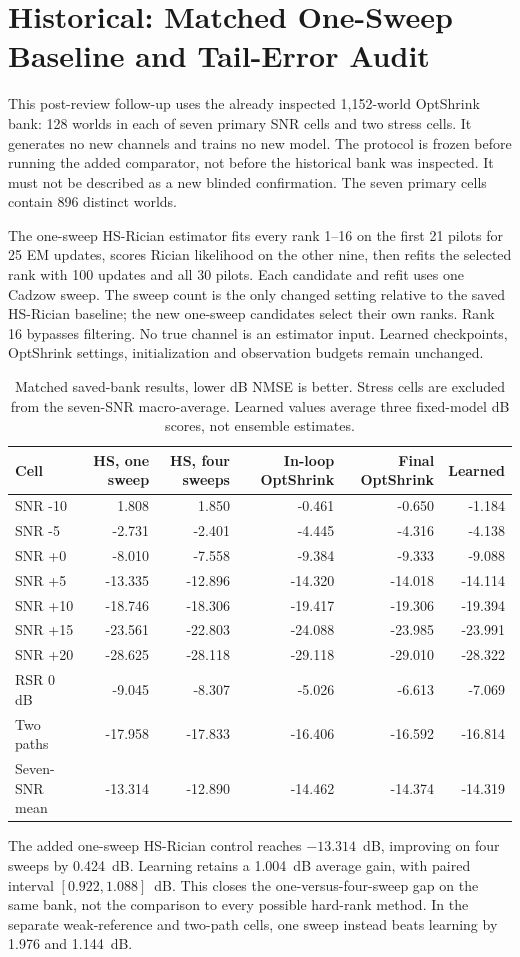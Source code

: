 \section{Historical: Matched One-Sweep Baseline and Tail-Error Audit}
This post-review follow-up uses the already inspected 1,152-world
OptShrink bank: 128 worlds in each of seven primary SNR cells and two
stress cells. It generates no new channels and trains no new model.
The protocol is frozen before running the added comparator, not before
the historical bank was inspected. It must not be described as a new
blinded confirmation. The seven primary cells contain 896 distinct worlds.

The one-sweep HS-Rician estimator fits every rank 1--16 on the first
21 pilots for 25 EM updates, scores Rician likelihood on the other nine,
then refits the selected rank with 100 updates and all 30 pilots.
Each candidate and refit uses one Cadzow sweep. The sweep count is the
only changed setting relative to the saved HS-Rician baseline; the new
one-sweep candidates select their own ranks. Rank 16 bypasses filtering.
No true channel is an estimator input. Learned checkpoints, OptShrink
settings, initialization and observation budgets remain unchanged.

\begin{table}[!t]
\caption{Matched saved-bank results, lower dB NMSE is better. Stress cells
are excluded from the seven-SNR macro-average. Learned values average
three fixed-model dB scores, not ensemble estimates.}
\centering\small\setlength{\tabcolsep}{5pt}
\begin{tabular}{@{}lrrrrr@{}}\toprule
Cell & HS, one sweep & HS, four sweeps & In-loop OptShrink & Final OptShrink & Learned\\\midrule
SNR -10 & 1.808 & 1.850 & -0.461 & -0.650 & -1.184\\
SNR -5 & -2.731 & -2.401 & -4.445 & -4.316 & -4.138\\
SNR +0 & -8.010 & -7.558 & -9.384 & -9.333 & -9.088\\
SNR +5 & -13.335 & -12.896 & -14.320 & -14.018 & -14.114\\
SNR +10 & -18.746 & -18.306 & -19.417 & -19.306 & -19.394\\
SNR +15 & -23.561 & -22.803 & -24.088 & -23.985 & -23.991\\
SNR +20 & -28.625 & -28.118 & -29.118 & -29.010 & -28.322\\
RSR 0 dB & -9.045 & -8.307 & -5.026 & -6.613 & -7.069\\
Two paths & -17.958 & -17.833 & -16.406 & -16.592 & -16.814\\
\midrule Seven-SNR mean & -13.314 & -12.890 & -14.462 & -14.374 & -14.319\\\bottomrule\end{tabular}\end{table}
The added one-sweep HS-Rician control reaches $-13.314$~dB,
improving on four sweeps by 0.424~dB. Learning retains a
1.004~dB average gain, with paired interval
$[0.922,1.088]$~dB. This closes the
one-versus-four-sweep gap on the same bank, not the comparison to every
possible hard-rank method. In the separate weak-reference and two-path
cells, one sweep instead beats learning by
1.976 and
1.144~dB.

